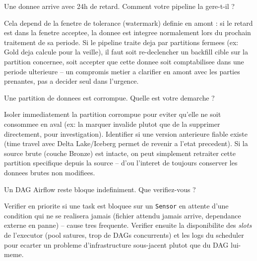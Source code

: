 \documentclass[11pt,a4paper]{article}
\begin{document}
\begin{question} Une donnee arrive avec 24h de retard. Comment votre pipeline la gere-t-il ?
\end{question}
\begin{reponse}
Cela depend de la fenetre de tolerance (watermark) definie en amont : si le retard est dans la fenetre acceptee, la donnee est integree normalement lors du prochain traitement de sa periode. Si le pipeline traite deja par partitions fermees (ex: Gold deja calcule pour la veille), il faut soit re-declencher un backfill cible sur la partition concernee, soit accepter que cette donnee soit comptabilisee dans une periode ulterieure -- un compromis metier a clarifier en amont avec les parties prenantes, pas a decider seul dans l'urgence.
\end{reponse}

\begin{question} Une partition de donnees est corrompue. Quelle est votre demarche ?
\end{question}
\begin{reponse}
Isoler immediatement la partition corrompue pour eviter qu'elle ne soit consommee en aval (ex: la marquer invalide plutot que de la supprimer directement, pour investigation). Identifier si une version anterieure fiable existe (time travel avec Delta Lake/Iceberg permet de revenir a l'etat precedent). Si la source brute (couche Bronze) est intacte, on peut simplement retraiter cette partition specifique depuis la source -- d'ou l'interet de toujours conserver les donnees brutes non modifiees.
\end{reponse}

\begin{question} Un DAG Airflow reste bloque indefiniment. Que verifiez-vous ?
\end{question}
\begin{reponse}
Verifier en priorite si une task est bloquee sur un \texttt{Sensor} en attente d'une condition qui ne se realisera jamais (fichier attendu jamais arrive, dependance externe en panne) -- cause tres frequente. Verifier ensuite la disponibilite des \emph{slots} de l'executor (pool satures, trop de DAGs concurrents) et les logs du scheduler pour ecarter un probleme d'infrastructure sous-jacent plutot que du DAG lui-meme.
\end{reponse}
\end{document}
